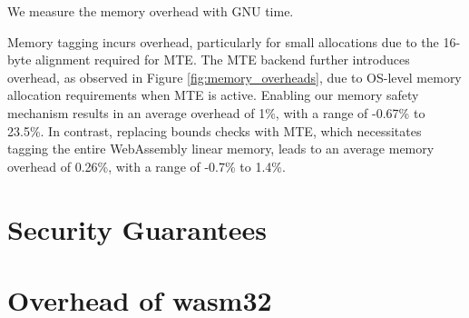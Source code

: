 We measure the memory overhead with GNU time.

Memory tagging incurs overhead, particularly for small allocations due to the 16-byte alignment required for MTE.
The MTE backend further introduces overhead, as observed in Figure \ref{fig:memory_overheads}, due to OS-level memory allocation requirements when MTE is active.
Enabling our memory safety mechanism results in an average overhead of 1\%, with a range of -0.67\% to 23.5\%.
In contrast, replacing bounds checks with MTE, which necessitates tagging the entire WebAssembly linear memory, leads to an average memory overhead of 0.26\%, with a range of -0.7\% to 1.4\%.

\section{Security Guarantees}\label{sec:security-guarantees}



\section{Overhead of wasm32}
\label{sec:eval-wasm32-wasm64}



